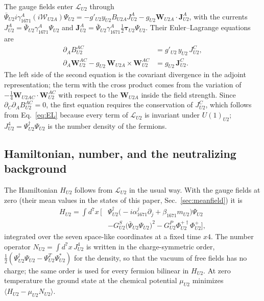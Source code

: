 The gauge fields enter $\mathcal L_{U2}$ through
$\bar\Psi_{U2}i\gamma^A_{1671}(i\mathcal W_{U2A})\Psi_{U2}=-g'_{U2}y_{U2}B_{U2A}J^A_{U2}
-g_{U2}\boldsymbol W_{U2A}\cdot\boldsymbol J^A_{U2}$, with the currents
$J^A_{U2}=\bar\Psi_{U2}\gamma^A_{1671}\Psi_{U2}$ and
$\boldsymbol J^A_{U2}=\bar\Psi_{U2}\gamma^A_{1671}\tfrac12\boldsymbol\tau_{U2}\Psi_{U2}$. Their
Euler--Lagrange equations are
\begin{equation}
\begin{aligned}
\partial_AB^{AC}_{U2}&=g'_{U2}\,y_{U2}\,J^C_{U2},\\
\partial_A\boldsymbol W^{AC}_{U2}-g_{U2}\,\boldsymbol W_{U2A}\times\boldsymbol W^{AC}_{U2}&=g_{U2}\,\boldsymbol J^C_{U2}.
\end{aligned}
\label{eq:gaugeeq}
\end{equation}
The left side of the second equation is the covariant divergence in the adjoint representation;
the term with the cross product comes from the variation of $-\tfrac14\boldsymbol W_{U2AC}\cdot\boldsymbol
W^{AC}_{U2}$ with respect to the $\boldsymbol W_{U2A}$ inside the field strength. Since
$\partial_C\partial_AB^{AC}_{U2}=0$, the first equation requires the conservation of
$J^C_{U2}$, which follows from Eq.~\eqref{eq:EL} because every term of $\mathcal L_{U2}$ is
invariant under $U(1)_{U2}$; $J^4_{U2}=\Psi^\dagger_{U2}\Psi_{U2}$ is the number density of the
fermions.

\subsection{Hamiltonian, number, and the neutralizing background}

The Hamiltonian $H_{U2}$ follows from $\mathcal L_{U2}$ in the usual way. With the gauge fields
at zero (their mean values in the states of this paper, Sec.~\ref{sec:meanfield}) it is
\begin{equation}
\begin{aligned}
H_{U2}=\int d^7x\,\Big[&\Psi^\dagger_{U2}\big(-i\alpha^j_{1671}\partial_j+\beta_{1671}m_{U2}\big)\Psi_{U2}\\
&-G^S_{U2}\big(\bar\Psi_{U2}\Psi_{U2}\big)^2-G^P_{U2}\Phi^{+\dagger}_{U2}\Phi^+_{U2}\Big],
\end{aligned}
\label{eq:H}
\end{equation}
integrated over the seven space-like coordinates at a fixed time $x4$. The number operator
$N_{U2}=\int d^7x\,J^4_{U2}$ is written in the charge-symmetric order,
$\tfrac12(\Psi^\dagger_{U2}\Psi_{U2}-\Psi^T_{U2}\Psi^{*}_{U2})$ for the density, so that the vacuum of
free fields has no charge; the same order is used for every fermion bilinear in $H_{U2}$. At
zero temperature the ground state at the chemical potential $\mu_{U2}$ minimizes
$\langle H_{U2}-\mu_{U2}N_{U2}\rangle$.

